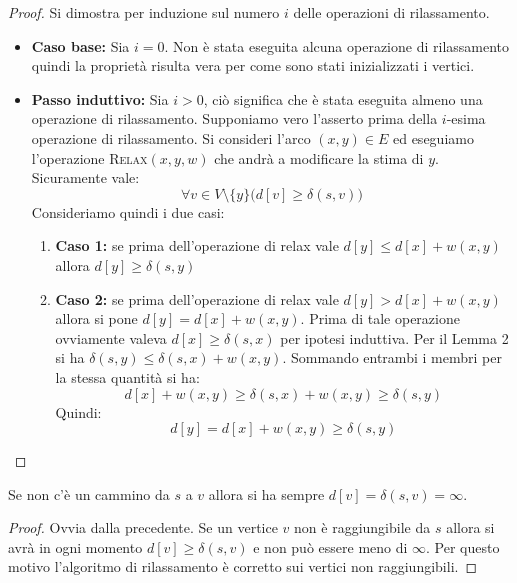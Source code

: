 \begin{proof}
	Si dimostra per induzione sul numero $i$ delle operazioni di rilassamento.
\begin{itemize}
	\item \textbf{Caso base:}  Sia $i=0$. Non è stata eseguita alcuna operazione di rilassamento quindi la proprietà risulta vera per come sono stati inizializzati i vertici.
	\item \textbf{Passo induttivo:} Sia $i>0$, ciò significa che è stata eseguita almeno una operazione di rilassamento. Supponiamo vero l'asserto prima della $i$-esima operazione di rilassamento. Si consideri l'arco $(x,y) \in E$ ed eseguiamo l'operazione \textsc{Relax}$(x,y,w)$ che andrà a modificare la stima di $y$. Sicuramente vale:
	\begin{displaymath}
		\forall v \in V\setminus\{y\} \bigl(d[v] \geq \delta(s,v)\bigr)
	\end{displaymath}
Consideriamo quindi i due casi:
\begin{enumerate}
	\item \textbf{Caso 1:} se prima dell'operazione di relax vale $d[y] \leq d[x] + w(x,y)$ allora $d[y] \geq \delta(s,y)$
	\item \textbf{Caso 2:} se prima dell'operazione di relax vale $d[y] > d[x] + w(x,y)$ allora si pone $d[y] = d[x] +w(x,y)$. Prima di tale operazione ovviamente valeva $d[x] \geq \delta(s,x)$ per ipotesi induttiva. Per il Lemma 2 si ha $\delta(s,y) \leq \delta(s,x)+w(x,y)$. Sommando entrambi i membri per la stessa quantità si ha:
	\begin{displaymath}
		d[x] + w(x,y) \geq \delta(s,x)+w(x,y) \geq \delta(s,y)
	\end{displaymath}
Quindi: \[ d[y] = d[x] + w(x,y) \geq \delta(s,y) \]
\end{enumerate}
\end{itemize}
\end{proof}


\begin{corolbox}
	Se non c'è un cammino da $s$ a $v$ allora si ha sempre $d[v] = \delta(s,v) = \infty$.
\end{corolbox}

\begin{proof}
	Ovvia dalla precedente. Se un vertice $v$ non è raggiungibile da $s$ allora si avrà in ogni momento $d[v] \geq \delta(s,v)$ e non può essere meno di $\infty$. Per questo motivo l'algoritmo di rilassamento è corretto sui vertici non raggiungibili.
\end{proof}


